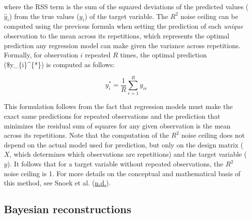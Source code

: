\documentclass[11pt,american,]{memoir} %
\begin{document}
where the RSS term is the sum of the squared deviations of the predicted values (\(\hat{y}_{i}\)) from the true values (\(y_{i}\)) of the target variable. The \(R^{2}\) noise ceiling can be computed using the previous formula when setting the prediction of each \emph{unique} observation to the mean across its repetitions, which represents the optimal prediction any regression model can make given the variance across repetitions. Formally, for observation \(i\) repeated \(R\) times, the optimal prediction (\$y\_\{i\}\^{}\{*\}) is computed as follows:

\begin{equation}
y_{i}^{*} = \frac{1}{R}\sum_{r=1}^{R}y_{ir}
\end{equation}

This formulation follows from the fact that regression models must make the exact same predictions for repeated observations and the prediction that minimizes the residual sum of squares for any given observation is the mean across its repetitions. Note that the computation of the \(R^{2}\) noise ceiling does not depend on the actual model used for prediction, but only on the design matrix (\(X\), which determines which observations are repetitions) and the target variable (\(y\)). It follows that for a target variable without repeated observations, the \(R^{2}\) noise ceiling is 1. For more details on the conceptual and mathematical basis of this method, see Snoek et al. (\protect\hyperlink{ref-snoek-submitted}{n.d.}).

\hypertarget{svsd-bayes}{%
\subsection{Bayesian reconstructions}\label{svsd-bayes}}
\end{document}
